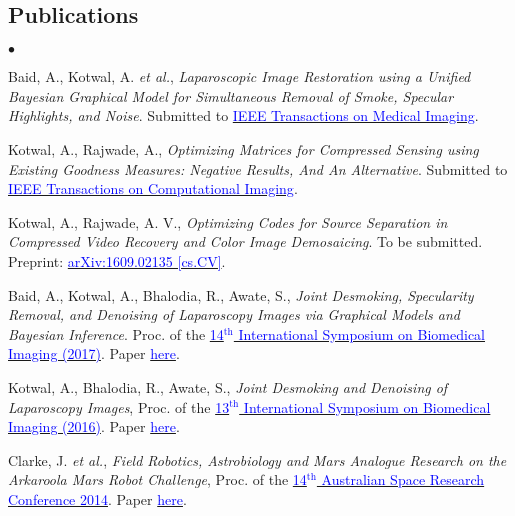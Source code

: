 \documentclass[margin,line]{res}
\newenvironment{list2}{
  \begin{list}{$\bullet$}{%
      \setlength{\itemsep}{0in}
      \setlength{\parsep}{0in} \setlength{\parskip}{0in}
      \setlength{\topsep}{0in} \setlength{\partopsep}{0in} 
      \setlength{\leftmargin}{0.18in}}}{\end{list}}
\begin{document}
\begin{resume}

\section{\sc Publications}
\begin{list2}
\item Baid, A., Kotwal, A. {\em et al.}, {\em Laparoscopic Image Restoration using a Unified Bayesian Graphical Model for Simultaneous Removal of Smoke, Specular Highlights, and Noise}. Submitted to \href{http://ieee-tmi.org}{\textcolor{blue} {IEEE Transactions on Medical Imaging}}.
\item Kotwal, A., Rajwade, A., {\em Optimizing Matrices for Compressed Sensing using Existing Goodness Measures: Negative Results, And An Alternative}. Submitted to \href{http://ieeexplore.ieee.org/xpl/RecentIssue.jsp?reload=true&punumber=6745852}{\textcolor{blue} {IEEE Transactions on Computational Imaging}}.
\item Kotwal, A., Rajwade, A. V., {\em Optimizing Codes for Source Separation in Compressed Video Recovery and Color Image Demosaicing}. To be submitted. 
Preprint: \href{https://arxiv.org/abs/1609.02135}{\textcolor{blue} {arXiv:1609.02135 [cs.CV]}}.
\item Baid, A., Kotwal, A., Bhalodia, R., Awate, S., {\em Joint Desmoking, Specularity Removal, and Denoising of Laparoscopy Images via Graphical Models and Bayesian Inference}. Proc. of the \href{http://biomedicalimaging.org/2017/}{\textcolor{blue} {14$^\text{th}$ International Symposium on Biomedical Imaging (2017)}}. Paper \href{http://ieeexplore.ieee.org/document/7950623/?reload=true}{\textcolor{blue} {here}}.
\item Kotwal, A., Bhalodia, R., Awate, S., {\em Joint Desmoking and Denoising of Laparoscopy Images}, Proc. of the \href{http://biomedicalimaging.org/2016/}{\textcolor{blue} {13$^\text{th}$ International Symposium on Biomedical Imaging (2016)}}. Paper \href{http://ieeexplore.ieee.org/document/7493446/?reload=true}{\textcolor{blue} {here}}.
\item Clarke, J. {\em et al.}, {\em Field Robotics, Astrobiology and Mars Analogue Research on the Arkaroola Mars Robot Challenge}, Proc. of the \href{http://www.nssa.com.au/14asrc/14ASRC-proceedings.zip}{\textcolor{blue} {14$^\text{th}$ Australian Space Research Conference 2014}}. Paper \href{http://alankarkotwal.github.io/pubs/asrc14.pdf}{\textcolor{blue} {here}}.
\end{list2}


\end{resume}
\end{document}

